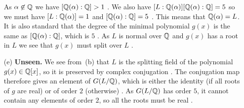 \documentclass[a4paper]{article}
\begin{document}
\begin{solution}
\begin{itemize}
   As $\alpha\not\in{\mathbb{Q}}$ we have $[{\mathbb{Q}}(\alpha):{\mathbb{Q}}]>1$ \mk.  We also have
   $[L:{\mathbb{Q}}(\alpha)][{\mathbb{Q}}(\alpha):{\mathbb{Q}}]=5$ so we must have $[L:{\mathbb{Q}}(\alpha)]=1$ and
   $[{\mathbb{Q}}(\alpha):{\mathbb{Q}}]=5$ .  This means that ${\mathbb{Q}}(\alpha)=L$.  It is also
   standard that the degree of the minimal polynomial $g(x)$ is the
   same as $[{\mathbb{Q}}(\alpha):{\mathbb{Q}}]$, which is $5$ \mk.  As $L$ is normal over ${\mathbb{Q}}$
   and $g(x)$ has a root in $L$ we see that $g(x)$ must split over
   $L$ \mk.
  \item[(e)] \textbf{Unseen.}
   We see from~(b) that $L$ is the splitting field of the
   polynomial $g(x)\in{\mathbb{Q}}[x]$, so it is preserved by complex
   conjugation \mk.  The conjugation map therefore gives an element of
   $G(L/{\mathbb{Q}})$, which is either the identity (if all roots of $g$ are
   real) or of order $2$ (otherwise) .  As $G(L/{\mathbb{Q}})$ has order $5$, it
   cannot contain any elements of order $2$, so all the roots must be
   real .  
 \end{itemize}
\end{solution}
\end{document}
